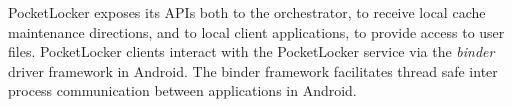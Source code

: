 PocketLocker exposes its APIs both to the orchestrator, to receive local
cache maintenance directions, and to local client applications, to provide
access to user files. PocketLocker clients interact with the PocketLocker
service via the \textit{binder} driver framework in Android. The binder
framework facilitates thread safe  inter process communication between
applications in Android.


